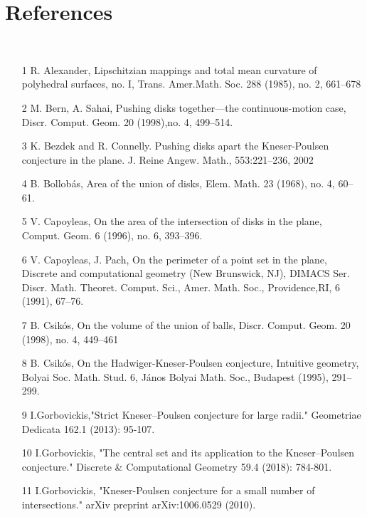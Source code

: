 \documentclass[12pt]{report}
\begin{document}
\chapter*{References}\\
\begin{enumerate}
\item [1] R. Alexander, Lipschitzian mappings and total mean curvature of polyhedral surfaces, no. I, Trans. Amer.Math. Soc. 288 (1985), no. 2, 661–678\\
\item [2] M. Bern, A. Sahai, Pushing disks together—the continuous-motion case, Discr. Comput. Geom. 20 (1998),no. 4, 499–514.\\
\item [3] K. Bezdek and R. Connelly. Pushing disks apart the Kneser-Poulsen conjecture in the plane.
J. Reine Angew. Math., 553:221–236, 2002\\
\item [4] B. Bollobás, Area of the union of disks, Elem. Math. 23 (1968), no. 4, 60–61.\\
\item [5] V. Capoyleas, On the area of the intersection of disks in the plane, Comput. Geom. 6 (1996), no. 6, 393–396.\\
\item [6] V. Capoyleas, J. Pach, On the perimeter of a point set in the plane, Discrete and computational geometry (New Brunswick, NJ), DIMACS Ser. Discr. Math. Theoret. Comput. Sci., Amer. Math. Soc., Providence,RI, 6 (1991), 67–76.\\
\item [7] B. Csikós, On the volume of the union of balls, Discr. Comput. Geom. 20 (1998), no. 4, 449–461\\
\item [8] B. Csikós, On the Hadwiger-Kneser-Poulsen conjecture, Intuitive geometry, Bolyai Soc. Math. Stud. 6, János Bolyai Math. Soc., Budapest (1995), 291–299.\\
\item [9] I.Gorbovickis,"Strict Kneser–Poulsen conjecture for large radii." Geometriae Dedicata 162.1 (2013): 95-107.\\
\item [10] I.Gorbovickis, "The central set and its application to the Kneser–Poulsen conjecture." Discrete & Computational Geometry 59.4 (2018): 784-801.\\
\item [11] I.Gorbovickis, "Kneser-Poulsen conjecture for a small number of intersections." arXiv preprint arXiv:1006.0529 (2010).\\

\end{enumerate}
\end{document}

